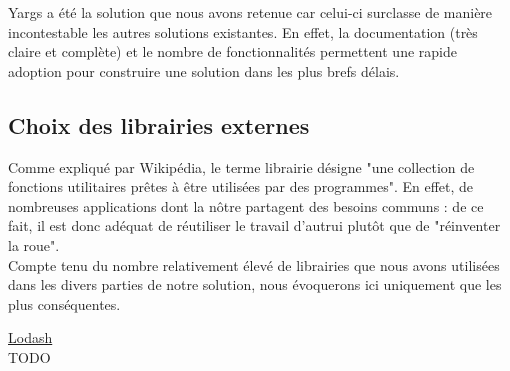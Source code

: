 Yargs a été la solution que nous avons retenue car celui-ci surclasse de manière incontestable les autres solutions existantes. En effet, la documentation (très claire et complète) et le nombre de fonctionnalités permettent une rapide adoption pour construire une solution dans les plus brefs délais. 

\subsection*{Choix des librairies externes}

Comme expliqué par Wikipédia\cite{libraryDef}, le terme librairie désigne "une collection de fonctions utilitaires prêtes à être utilisées par des programmes". En effet, de nombreuses applications dont la nôtre partagent des besoins communs : de ce fait, il est donc adéquat de réutiliser le travail d'autrui plutôt que de "réinventer la roue". \\

Compte tenu du nombre relativement élevé de librairies que nous avons utilisées dans les divers parties de notre solution, nous évoquerons ici uniquement que les plus conséquentes. \\






\pagebreak
{}

\underline{Lodash}\\

TODO

